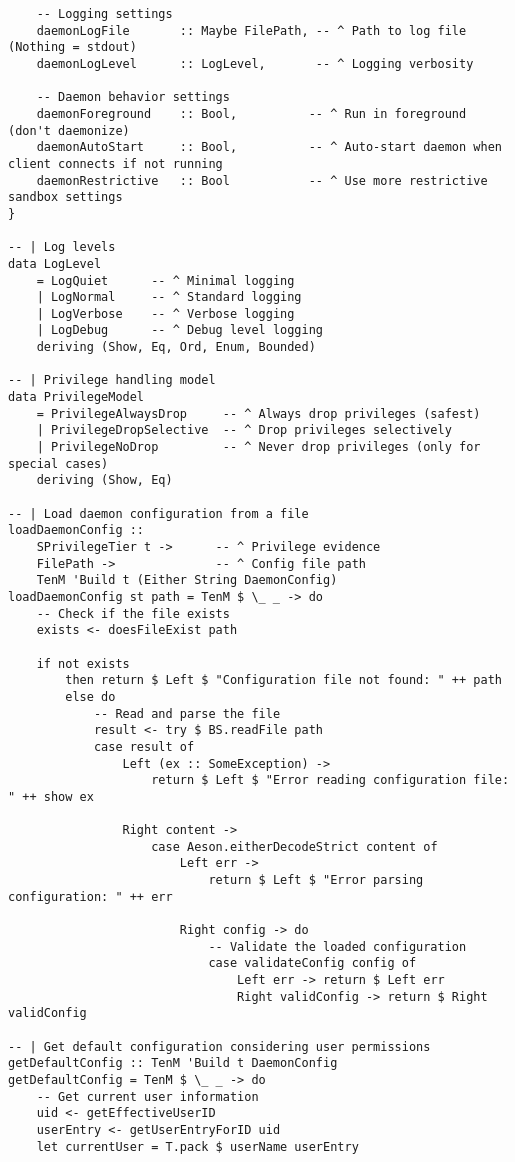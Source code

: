 \documentclass{article}
\begin{document}
\begin{tcolorbox}[title=Ten/Daemon/Config.hs Changes]
\begin{verbatim}
    -- Logging settings
    daemonLogFile       :: Maybe FilePath, -- ^ Path to log file (Nothing = stdout)
    daemonLogLevel      :: LogLevel,       -- ^ Logging verbosity

    -- Daemon behavior settings
    daemonForeground    :: Bool,          -- ^ Run in foreground (don't daemonize)
    daemonAutoStart     :: Bool,          -- ^ Auto-start daemon when client connects if not running
    daemonRestrictive   :: Bool           -- ^ Use more restrictive sandbox settings
}

-- | Log levels
data LogLevel
    = LogQuiet      -- ^ Minimal logging
    | LogNormal     -- ^ Standard logging
    | LogVerbose    -- ^ Verbose logging
    | LogDebug      -- ^ Debug level logging
    deriving (Show, Eq, Ord, Enum, Bounded)

-- | Privilege handling model
data PrivilegeModel
    = PrivilegeAlwaysDrop     -- ^ Always drop privileges (safest)
    | PrivilegeDropSelective  -- ^ Drop privileges selectively
    | PrivilegeNoDrop         -- ^ Never drop privileges (only for special cases)
    deriving (Show, Eq)

-- | Load daemon configuration from a file
loadDaemonConfig ::
    SPrivilegeTier t ->      -- ^ Privilege evidence
    FilePath ->              -- ^ Config file path
    TenM 'Build t (Either String DaemonConfig)
loadDaemonConfig st path = TenM $ \_ _ -> do
    -- Check if the file exists
    exists <- doesFileExist path

    if not exists
        then return $ Left $ "Configuration file not found: " ++ path
        else do
            -- Read and parse the file
            result <- try $ BS.readFile path
            case result of
                Left (ex :: SomeException) ->
                    return $ Left $ "Error reading configuration file: " ++ show ex

                Right content ->
                    case Aeson.eitherDecodeStrict content of
                        Left err ->
                            return $ Left $ "Error parsing configuration: " ++ err

                        Right config -> do
                            -- Validate the loaded configuration
                            case validateConfig config of
                                Left err -> return $ Left err
                                Right validConfig -> return $ Right validConfig

-- | Get default configuration considering user permissions
getDefaultConfig :: TenM 'Build t DaemonConfig
getDefaultConfig = TenM $ \_ _ -> do
    -- Get current user information
    uid <- getEffectiveUserID
    userEntry <- getUserEntryForID uid
    let currentUser = T.pack $ userName userEntry


\end{verbatim}
\end{tcolorbox}
\end{document}
